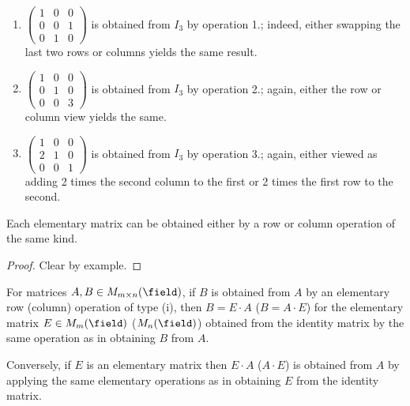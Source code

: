 \begin{example}
    \begin{enumerate}
        \item $\begin{pmatrix}
            1 & 0 & 0\\
            0 & 0 & 1\\
            0 & 1 & 0
        \end{pmatrix}$ is obtained from $I_3$ by operation 1.; indeed, either swapping the last two rows or columns yields the same result.
        \item $\begin{pmatrix}
            1 & 0 & 0\\
            0 & 1 & 0\\
            0 & 0 & 3
        \end{pmatrix}$ is obtained from $I_3$ by operation 2.; again, either the row or column view yields the same.
        \item $\begin{pmatrix}
            1 & 0 & 0\\
            2 & 1 & 0\\
            0 & 0 & 1
        \end{pmatrix}$ is obtained from $I_3$ by operation 3.; again, either viewed as adding 2 times the second column to the first or 2 times the first row to the second.
    \end{enumerate}
\end{example}

\begin{theorem}
    Each elementary matrix can be obtained either by a row or column operation of the same kind.
\end{theorem}
\begin{proof}
    Clear by example.
\end{proof}

\begin{theorem}
For matrices $A, B \in M_{m \times n}(\field)$, if $B$ is obtained from $A$ by an elementary row (column) operation of type (i), then $B = E \cdot A$ ($B = A \cdot E$) for the elementary matrix $E \in M_{m}(\field)$ ($M_n(\field)$) obtained from the identity matrix by the same operation as in obtaining $B$ from $A$.

Conversely, if $E$ is an elementary matrix then $E \cdot A$ ($A \cdot E$) is obtained from $A$ by applying the same elementary operations as in obtaining $E$ from the identity matrix.
\end{theorem}

